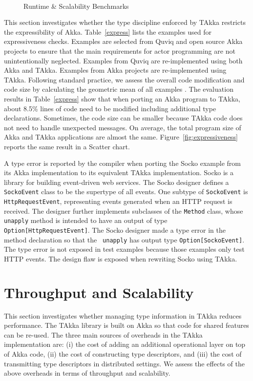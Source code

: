\begin{figure}[!ht]
\begin{center}
{        }\\
    \end{center}
    \caption{Runtime \& Scalability Benchmarks}
   \label{runtime}
   \vspace{-10pt}
\end{figure}

This section investigates whether the type discipline enforced by TAkka restricts the 
expressibility of Akka.  Table~\ref{express} lists the examples used for expressiveness checks.  
Examples are selected from Quviq \citep{quviq}
and open source Akka projects to ensure that the main requirements for actor 
programming are not unintentionally neglected.  Examples from 
Quviq are re-implemented using both Akka and TAkka.  Examples from 
Akka projects are re-implemented using TAkka.  Following standard practice,  
we assess the overall code modification and code 
size by calculating the geometric mean of all examples \citep{HePa06}. The evaluation results 
in Table~\ref{express} show that when porting an Akka program to TAkka, about 
8.5\% lines of code need to be modified including additional type declarations. 
Sometimes, the code size can be smaller because TAkka code does not 
need to handle unexpected messages.  On average, the total program size 
of Akka and TAkka applications are almost the same.  Figure~\ref{fig:expressiveness}
reports the same result in a Scatter chart.

A type error is reported by the compiler when porting the Socko example 
\citep{SOCKO} from its Akka implementation to its equivalent TAkka 
implementation. Socko is a library for building event-driven web services.  The 
Socko designer defines a {\tt SockoEvent} class to be the supertype of all 
events.  One subtype of {\tt SockoEvent} is {\tt HttpRequestEvent}, 
representing events generated when an HTTP request is received. The designer 
further implements subclasses of the {\tt Method} class, whose {\tt unapply} 
method is intended to have an output of type {\tt Option[HttpRequestEvent]}.  
The Socko designer made a type error in the method declaration so that the {\tt 
unapply} has output type {\tt Option[SockoEvent]}. The type error is not 
exposed in test examples because those examples only test HTTP events. 
The design flaw is exposed when rewriting Socko using TAkka.



\section{Throughput and Scalability}
\label{efficiency}
This section investigates whether managing type information in TAkka reduces
performance.  The TAkka library is built on Akka so that code for shared features 
can be re-used.  The three main sources of overheads in the TAkka implementation
are: (i) the cost of adding an additional operational layer on top of Akka 
code, (ii) the cost of constructing type descriptors, and (iii) the cost of 
transmitting type descriptors in distributed settings. We assess the effects of
the above overheads in terms of throughput and scalability.

